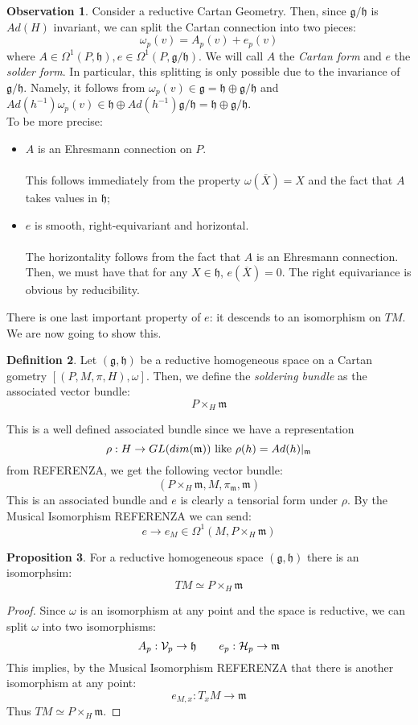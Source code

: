 \documentclass[12pt,a4paper]{report}
\theoremstyle{definition}
\newtheorem{Def}{Definition}[chapter]
\theoremstyle{Theorem}
\newtheorem{Prop}[Def]{Proposition}
\theoremstyle{definition}
\theoremstyle{definition}
\newtheorem{Obs}[Def]{Observation}
\begin{document}
	\begin{Obs}
		Consider a reductive Cartan Geometry. Then, since $\mathfrak{g/h}$ is $Ad(H)$ invariant, we can split the Cartan connection into two pieces:
		$$\omega_p(v)=A_p(v)+e_p(v)$$
		where $A\in\Omega^1(P,\mathfrak{h}),e\in\Omega^1(P,\mathfrak{g/h})$. We will call $A$ the \textit{Cartan form} and $e$ the \textit{solder form}. In particular, this splitting is only possible due to the invariance of $\mathfrak{g/h}$. Namely, it follows from $\omega_p(v)\in\mathfrak{g}=\mathfrak{h}\oplus\mathfrak{g/h}$ and $Ad(h^{-1})\omega_p(v)\in \mathfrak{h}\oplus Ad(h^{-1})\mathfrak{g/h}=\mathfrak{h}\oplus \mathfrak{g/h}$.\\ 
		To be more precise:
		\begin{itemize}
			\item $A$ is an Ehresmann connection on $P$.\\
			\\
			This follows immediately from the property $\omega(\overline{X})=X$ and the fact that $A$ takes values in $\mathfrak{h}$;
			\item $e$ is smooth, right-equivariant and horizontal.\\
			\\
			The horizontality follows from the fact that $A$ is an Ehresmann connection. Then, we must have that for any $X\in\mathfrak{h}$, $e(\overline{X})=0$. The right equivariance is obvious by reducibility.
		\end{itemize}
		There is one last important property of $e$: it descends to an isomorphism on $TM$. We are now going to show this.
	\end{Obs}
	\begin{Def}
		Let $(\mathfrak{g},\mathfrak{h})$ be a reductive homogeneous space on a Cartan gometry $[(P,M,\pi,H),\omega]$. Then, we define the \textit{soldering bundle} as the associated vector bundle:
		$$P\times_{H}\mathfrak{m}$$
	\end{Def}
	This is a well defined associated bundle since we have a representation $$\rho:H\rightarrow GL(dim(\mathfrak{m}))\hbox{ like }\rho(h)=Ad(h)|_\mathfrak{m}$$
	from REFERENZA, we get the following vector bundle:
	$$(P\times_{H}\mathfrak{m},M,\pi_{\mathfrak{m}},\mathfrak{m})$$
	This is an associated bundle and $e$ is clearly a tensorial form under $\rho$. By the Musical Isomorphism REFERENZA we can send:
	$$e\rightarrow e_M\in\Omega^1(M,P\times_{H}\mathfrak{m})$$
	\begin{Prop}
		For a reductive homogeneous space $(\mathfrak{g},\mathfrak{h})$ there is an isomorphsim:
		$$TM\simeq P\times_{H}\mathfrak{m}$$
	\end{Prop}
	\begin{proof}
		Since $\omega$ is an isomorphism at any point and the space is reductive, we can split $\omega$ into two isomorphisms:
		$$A_p:\mathcal{V}_p\rightarrow \mathfrak{h}\hspace{ 20 pt }e_p:\mathcal{H}_p\rightarrow \mathfrak{m}$$
		This implies, by the Musical Isomorphism REFERENZA that there is another isomorphism at any point:
		$$e_{M,x}:T_xM\rightarrow \mathfrak{m}$$
		Thus $TM\simeq P\times_{H}\mathfrak{m}$.
	\end{proof}
\end{document}
